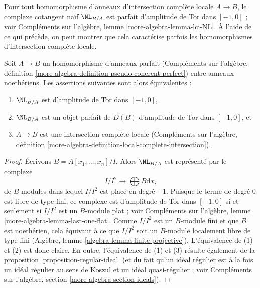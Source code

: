 \noindent
Pour tout homomorphisme d'anneaux d'intersection complète locale $A \to B$,
le complexe cotangent naïf $\NL_{B/A}$ est parfait
d'amplitude de Tor dans $[-1, 0]$ ; voir
Compléments sur l'algèbre, lemme \ref{more-algebra-lemma-lci-NL}.
À l'aide de ce qui précède, on peut montrer que cela caractérise parfois
les homomorphismes d'intersection complète locale.

\begin{lemma}
\label{lemma-perfect-NL-lci}
Soit $A \to B$ un homomorphisme d'anneaux parfait (Compléments sur l'algèbre, définition
\ref{more-algebra-definition-pseudo-coherent-perfect})
entre anneaux noethériens. Les assertions suivantes sont alors équivalentes :
\begin{enumerate}
\item $\NL_{B/A}$ est d'amplitude de Tor dans $[-1, 0]$,
\item $\NL_{B/A}$ est un objet parfait de $D(B)$
d'amplitude de Tor dans $[-1, 0]$, et
\item $A \to B$ est une intersection complète locale
(Compléments sur l'algèbre, définition
\ref{more-algebra-definition-local-complete-intersection}).
\end{enumerate}
\end{lemma}

\begin{proof}
Écrivons $B = A[x_1, \ldots, x_n]/I$. Alors $\NL_{B/A}$ est représenté par
le complexe
$$
I/I^2 \longrightarrow \bigoplus B \text{d}x_i
$$
de $B$-modules dans lequel $I/I^2$ est placé en degré $-1$. Puisque le terme de
degré $0$ est libre de type fini, ce complexe est d'amplitude de Tor dans $[-1, 0]$ si et
seulement si $I/I^2$ est un $B$-module plat ; voir
Compléments sur l'algèbre, lemme \ref{more-algebra-lemma-last-one-flat}.
Comme $I/I^2$ est un $B$-module fini et que $B$ est noethérien, cela équivaut
à ce que $I/I^2$ soit un $B$-module localement libre de type fini
(Algèbre, lemme \ref{algebra-lemma-finite-projective}).
L'équivalence de (1) et (2) est donc claire. En outre, l'équivalence
de (1) et (3) résulte également de la
proposition \ref{proposition-regular-ideal}
(et du fait qu'un idéal régulier est à la fois un idéal régulier au sens de Koszul
et un idéal quasi-régulier ; voir
Compléments sur l'algèbre, section \ref{more-algebra-section-ideals}).
\end{proof}

